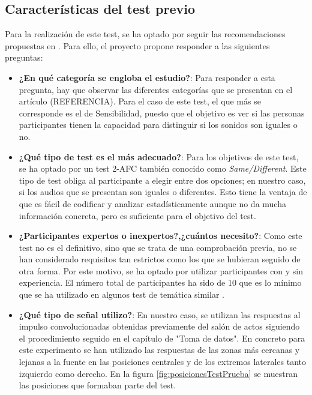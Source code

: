\documentclass[11pt,a4paper,twoside]{book}
\begin{document}
            \subsection{Características del test previo}
                Para la realización de este test, se ha optado por seguir las recomendaciones propuestas en \cite{Tejada2020}. Para ello, el proyecto propone responder a las siguientes preguntas:
                \begin{itemize}
                    \item \textbf{¿En qué categoría se engloba el estudio?}: Para responder a esta pregunta, hay que observar las diferentes categorías que se presentan en el artículo (REFERENCIA). Para el caso de este test, el que más se corresponde es el de Sensibilidad, puesto que el objetivo es ver si las personas participantes tienen la capacidad para distinguir si los sonidos son iguales o no.
                    \item \textbf{¿Qué tipo de test es el más adecuado?}: Para los objetivos de este test, se ha optado por un test 2-AFC también conocido como \textit{Same/Different}. Este tipo de test obliga al participante a elegir entre dos opciones; en nuestro caso, si los audios que se presentan son iguales o diferentes. Esto tiene la ventaja de que es fácil de codificar y analizar estadísticamente aunque no da mucha información concreta, pero es suficiente para el objetivo del test.
                    \item \textbf{¿Participantes expertos o inexpertos?,¿cuántos necesito?}: Como este test no es el definitivo, sino que se trata de una comprobación previa, no se han considerado requisitos tan estrictos como los que se hubieran seguido de otra forma. Por este motivo, se ha optado por utilizar participantes con y sin experiencia. El número total de participantes ha sido de 10 que es lo mínimo que se ha utilizado en algunos test de temática similar \cite{2019MNowak}.
                    \item \textbf{¿Qué tipo de señal utilizo?}: En nuestro caso, se utilizan las respuestas al impulso convolucionadas obtenidas previamente del salón de actos siguiendo el procedimiento seguido en el capítulo de "Toma de datos". En concreto para este experimento se han utilizado las respuestas de las zonas más cercanas y lejanas a la fuente en las posiciones centrales y de los extremos laterales tanto izquierdo como derecho. En la figura \ref{fig:posicionesTestPrueba} se muestran las posiciones que formaban parte del test.
                    

\end{itemize}
\end{document}
